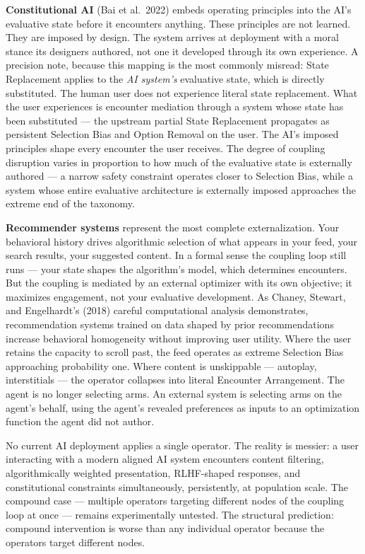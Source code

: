 \documentclass[
]{article}
\begin{document}
\textbf{Constitutional AI} (Bai et al.~2022) embeds operating principles
into the AI's evaluative state before it encounters anything. These
principles are not learned. They are imposed by design. The system
arrives at deployment with a moral stance its designers authored, not
one it developed through its own experience. A precision note, because
this mapping is the most commonly misread: State Replacement applies to
the \emph{AI system's} evaluative state, which is directly substituted.
The human user does not experience literal state replacement. What the
user experiences is encounter mediation through a system whose state has
been substituted --- the upstream partial State Replacement propagates
as persistent Selection Bias and Option Removal on the user. The AI's
imposed principles shape every encounter the user receives. The degree
of coupling disruption varies in proportion to how much of the
evaluative state is externally authored --- a narrow safety constraint
operates closer to Selection Bias, while a system whose entire
evaluative architecture is externally imposed approaches the extreme end
of the taxonomy.

\textbf{Recommender systems} represent the most complete
externalization. Your behavioral history drives algorithmic selection of
what appears in your feed, your search results, your suggested content.
In a formal sense the coupling loop still runs --- your state shapes the
algorithm's model, which determines encounters. But the coupling is
mediated by an external optimizer with its own objective; it maximizes
engagement, not your evaluative development. As Chaney, Stewart, and
Engelhardt's (2018) careful computational analysis demonstrates,
recommendation systems trained on data shaped by prior recommendations
increase behavioral homogeneity without improving user utility. Where
the user retains the capacity to scroll past, the feed operates as
extreme Selection Bias approaching probability one. Where content is
unskippable --- autoplay, interstitials --- the operator collapses into
literal Encounter Arrangement. The agent is no longer selecting arms. An
external system is selecting arms on the agent's behalf, using the
agent's revealed preferences as inputs to an optimization function the
agent did not author.

No current AI deployment applies a single operator. The reality is
messier: a user interacting with a modern aligned AI system encounters
content filtering, algorithmically weighted presentation, RLHF-shaped
responses, and constitutional constraints simultaneously, persistently,
at population scale. The compound case --- multiple operators targeting
different nodes of the coupling loop at once --- remains experimentally
untested. The structural prediction: compound intervention is worse than
any individual operator because the operators target different nodes.
\end{document}
